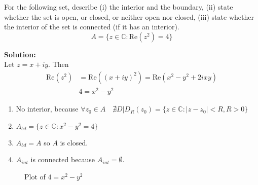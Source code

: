 \begin{example}
    For the following set, describe (i) the interior and the boundary, (ii) state whether the set is open, or closed, or neither open nor closed, (iii) state whether the interior of the set is connected (if it has an interior).
    $$A = \{z\in\mathbb{C}:\mathrm{Re}(z^2)=4\}$$

    \textbf{Solution:} \\
    Let $z=x+iy$. Then
    \begin{align*}
        \mathrm{Re}(z^2) & = \mathrm{Re}((x+iy)^2)
        = \mathrm{Re}(x^2-y^2+2ixy)                \\
                         & 4 = x^2-y^2
    \end{align*}
    \begin{enumerate}
        \item No interior, because $\forall z_0 \in A \quad \nexists D | D_R(z_0) = \{z \in \mathbb{C} : |z - z_0| < R, R > 0\} $
        \item $A_{bd} = \{z \in \mathbb{C} : x^2 - y^2 = 4\}$
        \item $ A_{bd} = A$ so $A$ is closed.
        \item $A_{int}$ is connected because $A_{int} = \emptyset$.
    \end{enumerate}
\end{example}
\begin{figure}[h]
    \centering
    \caption{Plot of $ 4 = x^2-y^2$}
\end{figure}

